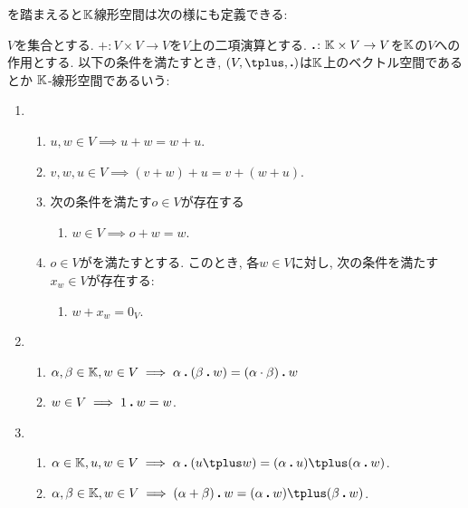を踏まえると$\mathbb{K}$線形空間は次の様にも定義できる:
\begin{definition}
$V$を集合とする.
$\plus\colon V\times V \to V$を$V$上の二項演算とする.
$\mathbin{\boldsymbol{.}} \colon \mathbb{K}\times V \to V$を$\mathbb{K}$の$V$への作用とする.
以下の条件を満たすとき,
$(V,\plus,\act)$は$\mathbb{K}$上のベクトル空間であるとか
$\mathbb{K}$-線形空間であるいう:
  \begin{enumerate}
  \item 
    \begin{enumerate}
    \item $u,w \in V\implies  u\plus w=w\plus u$.
    \item
      $v,w,u\in V \implies (v\plus w)\plus u=v\plus (w\plus u)$.
    \item
    次の条件を満たす$o\in V$が存在する
    \begin{enumerate}
          \label{def:vecsp:item:sum:zero}
    \item $w\in V \implies o\plus w=w$.
    \end{enumerate}
    \item
    $o\in V$がを満たすとする.
    このとき,
    各$w\in V$に対し, 次の条件を満たす$x_w\in V$が存在する:
\begin{enumerate}
\item $w\plus x_w=0_V$.
\end{enumerate}
    \end{enumerate}
  \item
    \begin{enumerate}
    \item
      $\alpha ,\beta\in\mathbb{K}, w\in V \implies \alpha \mathbin{\boldsymbol{.}} (\beta\mathbin{\boldsymbol{.}} w)=(\alpha \cdot \beta)\mathbin{\boldsymbol{.}} w$
    \item $w\in V \implies 1\mathbin{\boldsymbol{.}} w=w$.
    \end{enumerate}
  \item
    \begin{enumerate}
    \item $\alpha \in \KK,u,w\in V \implies \alpha \act (u\plus w)=(\alpha \act u)\plus (\alpha \act w)$.
    \item $\alpha ,\beta\in\KK, w\in V\implies (\alpha +\beta)\act w=(\alpha\act w)\plus (\beta\act w)$.
    \end{enumerate}
  \end{enumerate}
\end{definition}








